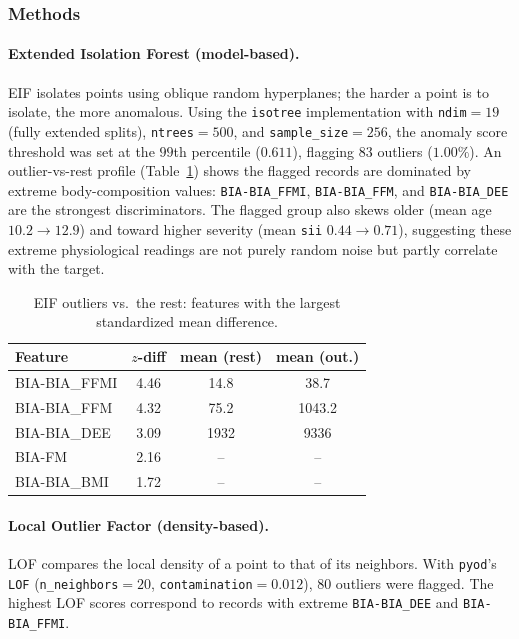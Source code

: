 \subsubsection{Methods}
\paragraph{Extended Isolation Forest (model-based).} EIF \cite{eif} isolates points using oblique random hyperplanes; the harder a point is to isolate, the more anomalous. Using the \texttt{isotree} implementation with \texttt{ndim}$=19$ (fully extended splits), \texttt{ntrees}$=500$, and \texttt{sample\_size}$=256$, the anomaly score threshold was set at the $99$th percentile ($0.611$), flagging $83$ outliers ($1.00\%$). An outlier-vs-rest profile (Table~\ref{tab:cmi_eif_profile}) shows the flagged records are dominated by extreme body-composition values: \texttt{BIA-BIA\_FFMI}, \texttt{BIA-BIA\_FFM}, and \texttt{BIA-BIA\_DEE} are the strongest discriminators. The flagged group also skews older (mean age $10.2\to12.9$) and toward higher severity (mean \texttt{sii} $0.44\to0.71$), suggesting these extreme physiological readings are not purely random noise but partly correlate with the target.

\begin{table}[H]
\centering
\small
\caption{EIF outliers vs.\ the rest: features with the largest standardized mean difference.}
\label{tab:cmi_eif_profile}
\begin{tabular}{l c c c}
\hline
Feature & $z$-diff & mean (rest) & mean (out.) \\
\hline
BIA-BIA\_FFMI & 4.46 & 14.8  & 38.7 \\
BIA-BIA\_FFM  & 4.32 & 75.2  & 1043.2 \\
BIA-BIA\_DEE  & 3.09 & 1932  & 9336 \\
BIA-FM        & 2.16 & --    & -- \\
BIA-BIA\_BMI  & 1.72 & --    & -- \\
\hline
\end{tabular}
\end{table}

\paragraph{Local Outlier Factor (density-based).} LOF \cite{lof} compares the local density of a point to that of its neighbors. With \texttt{pyod}'s \texttt{LOF} (\texttt{n\_neighbors}$=20$, \texttt{contamination}$=0.012$), $80$ outliers were flagged. The highest LOF scores correspond to records with extreme \texttt{BIA-BIA\_DEE} and \texttt{BIA-BIA\_FFMI}.

